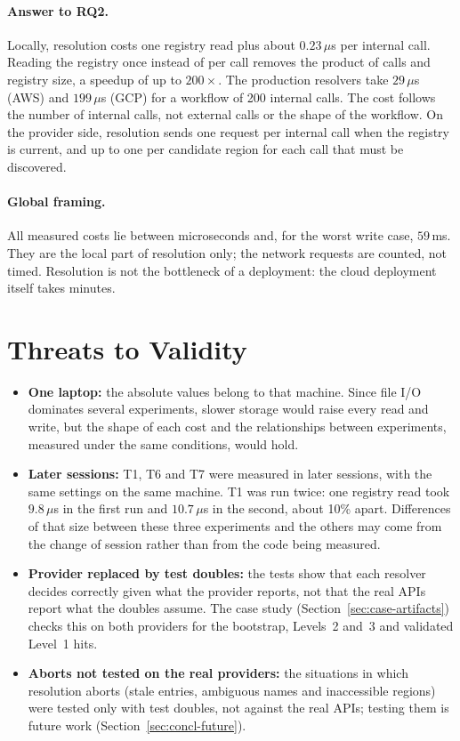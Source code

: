 \paragraph{Answer to RQ2.}
Locally, resolution costs one registry read plus about $0.23\,\mu$s per internal call. Reading the registry
once instead of per call removes the product of calls and registry size, a speedup of up to
$200\times$. The production resolvers take $29\,\mu$s (AWS) and $199\,\mu$s (GCP) for a workflow
of 200 internal calls. The cost follows the number of internal calls, not external calls or the shape of the
workflow. On the provider side, resolution sends one request per internal call when the registry
is current, and up to one per candidate region for each call that must be discovered.

\paragraph{Global framing.}
All measured costs lie between microseconds and, for the worst write case, $59$\,ms. They are the
local part of resolution only; the network requests are counted, not timed. Resolution is not the
bottleneck of a deployment: the cloud deployment itself takes minutes.

\section{Threats to Validity}
\label{sec:eval-threats}

\begin{itemize}
  \item \textbf{One laptop:} the absolute values belong to that machine. Since file I/O dominates
  several experiments, slower storage would raise every read and write, but the shape of each cost
  and the relationships between experiments, measured under the same conditions, would hold.
  \item \textbf{Later sessions:} T1, T6 and T7 were measured in later sessions, with the same
  settings on the same machine. T1 was run twice: one registry read took $9.8\,\mu$s in the first
  run and $10.7\,\mu$s in the second, about 10\% apart. Differences of that size between these
  three experiments and the others may come from the change of session rather than from the code
  being measured.
  \item \textbf{Provider replaced by test doubles:} the tests show that each resolver decides
  correctly given what the provider reports, not that the real APIs report what the doubles
  assume. The case study (Section~\ref{sec:case-artifacts}) checks this on both providers for the
  bootstrap, Levels~2 and~3 and validated Level~1 hits.
  \item \textbf{Aborts not tested on the real providers:} the situations in which resolution
  aborts (stale entries, ambiguous names and inaccessible regions) were tested only with test
  doubles, not against the real APIs; testing them is future work (Section~\ref{sec:concl-future}).
\end{itemize}

\renewcommand{\topfraction}{0.7}
\renewcommand{\textfraction}{0.2}
\renewcommand{\floatpagefraction}{0.5}
